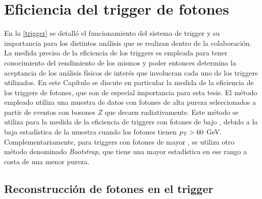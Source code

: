 \chapter{Eficiencia del trigger de fotones}



En la \autoref{trigger} se detalló el funcionamiento del sistema de trigger y su importancia para los distintos análisis que se realizan dentro de la colaboración. La medida precisa de la eficiencia de los triggers es empleada para tener conocimiento del rendimiento de los mismos y poder entonces determina la aceptancia de los análisis físicos de interés que involucran cada uno de los triggers utilizados. 
En este Capítulo se discute en particular la medida de la eficiencia de los triggers de fotones, que son de especial importancia para esta tesis. El método empleado utiliza una muestra de datos con fotones de alta pureza seleccionados a partir de eventos con bosones $Z$ que decaen radiativamente. Este método se utiliza para la medida de la eficiencia de triggers con fotones de bajo \pt, debido a la baja estadística de la muestra cuando los fotones tienen $p_{\text{T}}>60$ GeV. Complementariamente, para triggers con fotones de mayor \pt, se utiliza otro método denominado \textit{Bootstrap}, que tiene una mayor estadística en ese rango a costa de una menor pureza. 


\section{Reconstrucción de fotones en el trigger}


